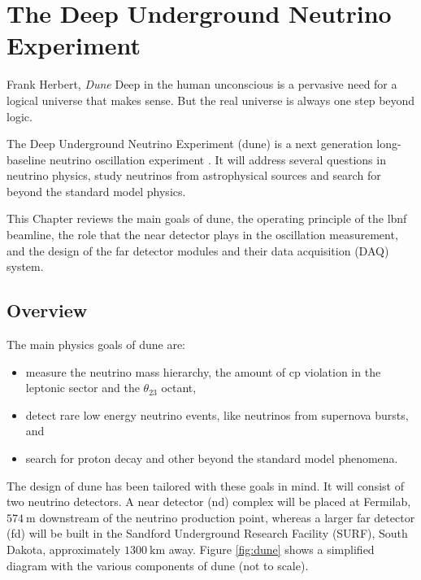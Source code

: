 \chapter{The Deep Underground Neutrino Experiment}
\label{chapter:dune}

\begin{chapquote}{Frank Herbert, \textit{Dune}}
	Deep in the human unconscious is a pervasive need for a logical universe that makes sense. But the real universe is always one step beyond logic.
\end{chapquote}

The Deep Underground Neutrino Experiment (\gls{dune}) is a next generation long-baseline neutrino oscillation experiment \cite{DUNE2020TDR1}. It will address several questions in neutrino physics, study neutrinos from astrophysical sources and search for beyond the standard model physics.

This Chapter reviews the main goals of \gls{dune}, the operating principle of the \gls{lbnf} beamline, the role that the near detector plays in the oscillation measurement, and the design of the far detector modules and their data acquisition (DAQ) system.

\section{Overview}

The main physics goals of \gls{dune} are:
\begin{itemize}
	\item measure the neutrino mass hierarchy, the amount of \gls{cp} violation in the leptonic sector and the $\theta_{23}$ octant,
	\item detect rare low energy neutrino events, like neutrinos from supernova bursts, and
	\item search for proton decay and other beyond the standard model phenomena.
\end{itemize}

The design of \gls{dune} has been tailored with these goals in mind. It will consist of two neutrino detectors. A near detector (\gls{nd}) complex will be placed at Fermilab, $574~\mathrm{m}$ downstream of the neutrino production point, whereas a larger far detector (\gls{fd}) will be built in the Sandford Underground Research Facility (SURF), South Dakota, approximately $1300~\mathrm{km}$ away. Figure \ref{fig:dune} shows a simplified diagram with the various components of \gls{dune} (not to scale).

